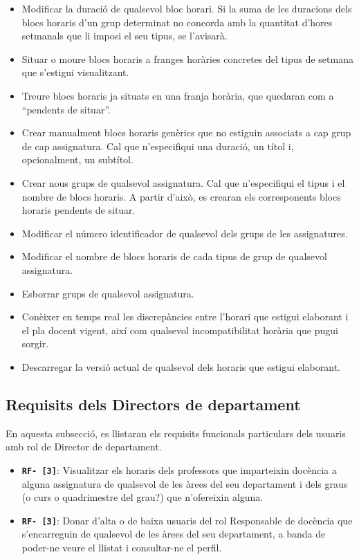 \documentclass[a4paper,12pt]{ThesisStyle}
\begin{document}
\begin{itemize}
\begin{itemize}
      \item Modificar la duració de qualsevol bloc horari. Si la suma de les duracions dels blocs horaris d'un grup determinat no concorda amb la quantitat d'hores setmanals que li imposi el seu tipus, se l'avisarà.
      
      \item Situar o moure blocs horaris a franges horàries concretes del tipus de setmana que s'estigui visualitzant.
      \item Treure blocs horaris ja situats en una franja horària, que quedaran com a ``pendents de situar''.
      \item Crear manualment blocs horaris genèrics que no estiguin associats a cap grup de cap assignatura. Cal que n'especifiqui una duració, un títol i, opcionalment, un subtítol.
      
      \item Crear nous grups de qualsevol assignatura. Cal que n'especifiqui el tipus i el nombre de blocs horaris. A partir d'això, es crearan els corresponents blocs horaris pendents de situar.
      \item Modificar el número identificador de qualsevol dels grups de les assignatures.
      \item Modificar el nombre de blocs horaris de cada tipus de grup de qualsevol assignatura.
      \item Esborrar grups de qualsevol assignatura.
      \item Conèixer en temps real les discrepàncies entre l'horari que estigui elaborant i el pla docent vigent, així com qualsevol incompatibilitat horària que pugui sorgir.
      
      \item Descarregar la versió actual de qualsevol dels horaris que estigui elaborant.
    \end{itemize}
\end{itemize}

\subsection{Requisits dels Directors de departament} %
\label{subsec:requisits_director_departament}

En aquesta subsecció, es llistaran els requisits funcionals particulars dels usuaris amb rol de Director de departament.

\begin{itemize}
  \item \texttt{\textbf{RF- [3]}}: Visualitzar els horaris dels professors que imparteixin docència a alguna assignatura de qualsevol de les àrees del seu departament i dels graus (o curs o quadrimestre del grau?) que n'ofereixin alguna.
  \item \texttt{\textbf{RF- [3]}}: Donar d'alta o de baixa usuaris del rol Responsable de docència que s'encarreguin de qualsevol de les àrees del seu departament, a banda de poder-ne veure el llistat i consultar-ne el perfil.
\end{itemize}
\end{document}
